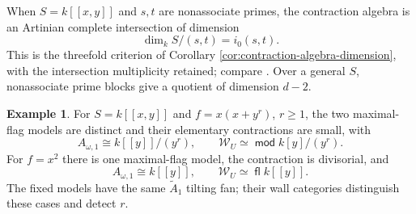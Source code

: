 \documentclass[a4paper,reqno]{amsart}
\def\W{\mathcal{W}}
\DeclareMathOperator{\md}{\mathsf{mod}}
\renewcommand{\mod}{\md}
\DeclareMathOperator{\fl}{\mathsf{fl}}
\theoremstyle{definition}
\newtheorem{Ex}[Thm]{Example}
\begin{document}
When $S=k[[x,y]]$ and $s,t$ are nonassociate primes, the contraction algebra is an Artinian complete intersection of dimension
\[
\dim_kS/(s,t)=i_0(s,t).
\]
This is the threefold criterion of Corollary \ref{cor:contraction-algebra-dimension}, with the intersection multiplicity retained; compare \cite[Theorem 5.5 and Section 6]{Wem23survey}. Over a general $S$, nonassociate prime blocks give a quotient of dimension $d-2$.

\begin{Ex}\label{ex:wall-intersection-multiplicity}
For $S=k[[x,y]]$ and $f=x(x+y^r)$, $r\ge1$, the two maximal-flag models are distinct and their elementary contractions are small, with
\[
A_{\omega,1}\cong k[[y]]/(y^r),\qquad
\W_U\simeq\mod k[y]/(y^r).
\]
For $f=x^2$ there is one maximal-flag model, the contraction is divisorial, and
\[
A_{\omega,1}\cong k[[y]],\qquad \W_U\simeq\fl k[[y]].
\]
The fixed models have the same $\widetilde A_1$ tilting fan; their wall categories distinguish these cases and detect $r$.
\end{Ex}


 

\enlargethispage{4\baselineskip}
\end{document}
